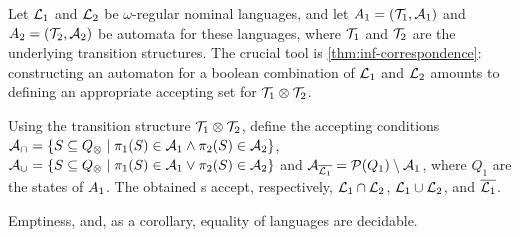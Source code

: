 \newcommand{\compl}[1]{\overline{#1}}
 

Let $\mathcal{L}_1$ and $\mathcal{L}_2$ be $\omega$-regular nominal languages, and let $A_1 = (\mathcal{T}_1,\mathcal{A}_1)$  and $A_2 = (\mathcal{T}_2,\mathcal{A}_2)$ be automata for these languages, where $\mathcal{T}_1$ and $\mathcal{T}_2$ are the underlying transition structures.
The crucial tool is \cref{thm:inf-correspondence}: constructing an automaton for a boolean combination of $\mathcal{L}_1$ and $\mathcal{L}_2$ amounts to defining an appropriate accepting set for $\mathcal{T}_1 \otimes \mathcal{T}_2$.


\begin{theorem}
Using the transition structure $\mathcal{T}_1 \otimes \mathcal{T}_2$, define the accepting conditions $\mathcal{A}_\cap = \{ S \subseteq Q_{\otimes} \mid \pi_1(S) \in \mathcal{A}_1 \land \pi_2(S) \in \mathcal{A}_2 \}$, $\mathcal{A}_\cup = \{ S \subseteq Q_{\otimes} \mid \pi_1(S) \in \mathcal{A}_1 \lor \pi_2(S) \in \mathcal{A}_2 \} $ and $\acc_{\compl{\Lang_1}} = \Pow(Q_1) \setminus \acc_1$, where $Q_1$ are the states of $A_1$.
%
%
%
The obtained \hdma{}s accept, respectively, $\mathcal{L}_1 \cap \mathcal{L}_2$, $\mathcal{L}_1 \cup \mathcal{L}_2$, and $\compl{\Lang_1}$.
\label{thm:bool-closure}
\end{theorem}
%
\begin{theorem}
\label{thm:decidable}
Emptiness, and, as a corollary, equality of languages are decidable.
\end{theorem}
